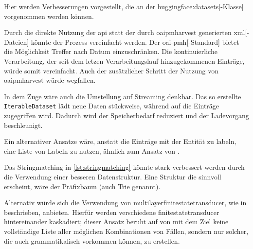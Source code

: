 Hier werden Verbesserungen vorgestellt,
die an der \gls{huggingface:datasets}[-Klasse]
vorgenommen werden können.

Durch die direkte Nutzung der \gls{api}
statt der durch \gls{oaipmharvest} generierten \gls{xml}[-Dateien]
könnte der Prozess vereinfacht werden.
Der \gls{oai-pmh}[-Standard] bietet die Möglichkeit Treffer nach Datum einzuschränken.
Die kontinuierliche Verarbeitung,
der seit dem letzen Verarbeitungslauf hinzugekommenen Einträge,
würde somit vereinfacht.
Auch der zusätzlicher Schritt der Nutzung von \gls{oaipmharvest} würde wegfallen.

In dem Zuge wäre auch die Umstellung auf Streaming denkbar.
Das so erstellte \texttt{IterableDataset}
lädt neue Daten stückweise,
während auf die Einträge zugegriffen wird.
Dadurch wird der Speicherbedarf reduziert
und der Ladevorgang beschleunigt.

Ein alternativer Ansatze wäre,
anstatt die Einträge mit der Entität zu labeln,
eine Liste von Labeln zu nutzen,
ähnlich zum Ansatz von \autocite{2006.15509}.

Das Stringmatching in \cref{lst:stringmatching} könnte stark verbessert werden
durch die Verwendung einer besseren Datenstruktur.
Eine Struktur die sinnvoll erscheint,
wäre der Präfixbaum (auch Trie genannt).

Alternativ würde sich die Verwendung von \gls{multilayerfinitestatetransducer},
wie in 
beschrieben,
anbieten.\autocite{OASIcs-LDK-2019-11}
Hierfür werden verschiedene \gls{finitestatetransducer}
hintereinander kaskadiert;
dieser Ansatz beruht auf 
von \citeauthor{10.1017/S1351324997001599} \autocite{10.1017/S1351324997001599}
mit dem Ziel keine vollständige Liste
aller möglichen Kombinationen von Fällen,
sondern nur solcher,
die auch grammatikalisch vorkommen können,
zu erstellen.
